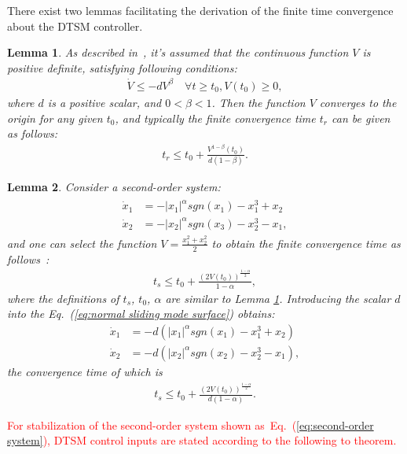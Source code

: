 \documentclass[3p]{elsarticle}
\theoremstyle{plain}
\newtheorem{mylem}{Lemma}
\theoremstyle{remark}
\begin{document}
There exist two lemmas facilitating the derivation of the finite time convergence about the DTSM controller.
\begin{mylem}
As described in~\cite{moulay2006finite}, it's assumed that the continuous function $V$ is positive definite, satisfying following conditions:
\begin{align}
\dot V\le -dV^\beta\quad\forall t\ge t_0, V(t_0)\ge 0,
\end{align}
where $d$ is a positive scalar, and $0<\beta<1$. Then the function $V$ converges to the origin for any given $t_0$, and typically the finite convergence time $t_r$ can be given as follows:
\begin{align}
t_r \le t_0+\frac{V^{1-\beta}(t_0)}{d(1-\beta)}.
\end{align}\label{lemma:1}
\end{mylem}
\begin{mylem}
Consider a second-order system:
\begin{align}
\begin{split}
\dot x_1&=-\vert x_1\vert^\alpha sgn(x_1)-x_1^3+x_2\\
\dot x_2&=-\vert x_2\vert^\alpha sgn(x_3)-x_2^3-x_1,\label{eq:normal sliding mode  surface}
\end{split}
\end{align}
and one can select the function $V = \frac{x_1^2+x_2^2}{2}$ to obtain the finite convergence time as follows~\cite{moulay2006finite}:
\begin{align}
t_s\le t_0+\frac{(2V(t_0))^{\frac{1-\alpha}{2}}}{1-\alpha},
\end{align}
where the definitions of  $t_s$, $t_0$, $\alpha$ are similar to Lemma \ref{lemma:1}. Introducing the scalar $d$ into the Eq.~(\ref{eq:normal sliding mode  surface}) obtains:
\begin{align}
\dot x_1&=-d(\vert x_1\vert^\alpha sgn(x_1)-x_1^3+x_2)\\
\dot x_2&=-d(\vert x_2\vert^\alpha sgn(x_2)-x_2^3-x_1),\label{eq:more normal sliding mode  surface}
\end{align}
the convergence time of which is
\begin{align}
t_s\le t_0+\frac{(2V(t_0))^{\frac{1-\alpha}{2}}}{d(1-\alpha)}.
\end{align}\label{lemma:2}
\end{mylem}

\textcolor{red}{For stabilization of the second-order system shown as~Eq.~(\ref{eq:second-order system}), DTSM control inputs are stated according to the following to theorem.}
\end{document}
